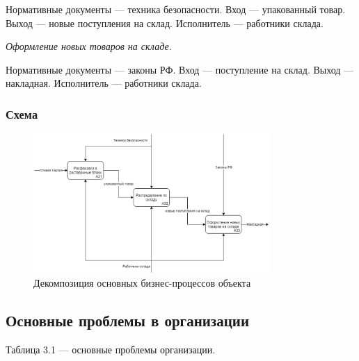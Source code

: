 Нормативные документы --- техника безопасности.  Вход --- упакованный товар.  Выход --- новые поступления на склад.  Исполнитель --- работники склада.

\emph{Оформление новых товаров на складе.} 

Нормативные документы --- законы РФ. Вход --- поступление на склад. Выход --- накладная. Исполнитель --- работники склада.

\subsubsection{Схема}
\begin{figure}[h!]
        \centering
        \includegraphics[width=0.8\textwidth]{images/3/decompose.eps}
	\caption{Декомпозиция основных бизнес-процессов объекта}
\end{figure}

\subsection{Основные проблемы в организации}

Таблица 3.1 --- основные проблемы организации.

\begin{table}[h!]
\end{table}

